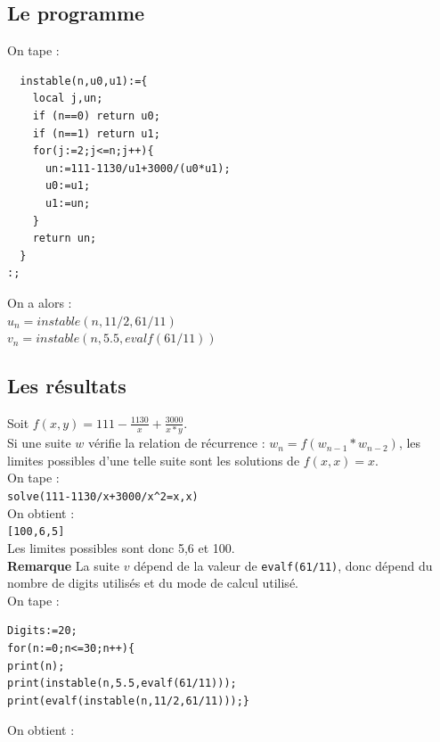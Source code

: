 \documentclass[a4paper,11pt]{book}
\begin{document}
\subsection{Le programme}
On tape :
\begin{verbatim}
  instable(n,u0,u1):={
    local j,un;
    if (n==0) return u0;
    if (n==1) return u1;
    for(j:=2;j<=n;j++){
      un:=111-1130/u1+3000/(u0*u1);
      u0:=u1;
      u1:=un;
    }
    return un;
  }
:;
\end{verbatim}
On a alors :\\
$u_n=instable(n,11/2,61/11)$ \\
$v_n=instable(n,5.5,evalf(61/11))$
\subsection{Les r\'esultats}
Soit $f(x,y)=111-\frac{1130}{x}+\frac{3000}{x*y}$.\\
Si une suite $w$ v\'erifie la relation de r\'ecurrence :
$w_n=f(w_{n-1}*w_{n-2})$, les limites possibles d'une telle suite sont les 
solutions de $f(x,x)=x$.\\
On tape :\\
{\tt solve(111-1130/x+3000/x\verb|^|2=x,x)}\\ 
On obtient :\\ 
{\tt [100,6,5]}\\
Les limites possibles sont donc 5,6 et 100.\\
{\bf Remarque}
La suite $v$ d\'epend de la valeur de {\tt evalf(61/11)}, donc d\'epend du 
nombre de digits utilis\'es et du mode de calcul utilis\'e.\\ 
On tape :
\begin{verbatim}
Digits:=20;
for(n:=0;n<=30;n++){
print(n);
print(instable(n,5.5,evalf(61/11)));
print(evalf(instable(n,11/2,61/11)));}
\end{verbatim}
On obtient :
\end{document}
